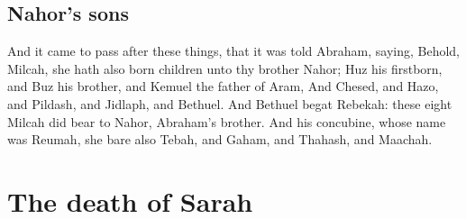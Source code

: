 \begin{biblechapter}
\section*{Nahor's sons}
\verse And it came to pass after these things, that it was told Abraham, saying, Behold, Milcah, she hath also born children unto thy brother Nahor;
\verse Huz his firstborn, and Buz his brother, and Kemuel the father of Aram,
\verse And Chesed, and Hazo, and Pildash, and Jidlaph, and Bethuel.
\verse And Bethuel begat Rebekah: these eight Milcah did bear to Nahor, Abraham's brother.
\verse And his concubine, whose name was Reumah, she bare also Tebah, and Gaham, and Thahash, and Maachah.
\end{biblechapter}

\section*{The death of Sarah}
